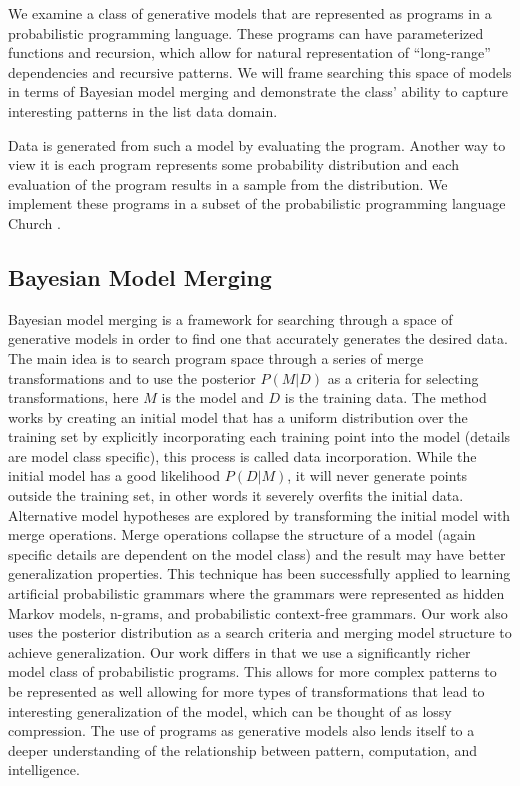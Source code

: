 \documentclass[a4paper,10pt]{article}
\begin{document}
We examine a class of generative models that are represented as programs in a probabilistic programming language.  These programs can have parameterized functions and recursion, which allow for natural representation of ``long-range'' dependencies and recursive patterns.  We will frame searching this space of models in terms of Bayesian model merging \cite{Stolcke:1994:IPG:645515.658235} and demonstrate the class' ability to capture interesting patterns in the list data domain.

Data is generated from such a model by evaluating the program.  Another way to view it is each program represents some probability distribution and each 
evaluation of the program results in a sample from the distribution. We implement these programs in a subset of the probabilistic programming language Church \cite{N.D.Goodman:2008:f2a0d}.  


\subsection{Bayesian Model Merging}
Bayesian model merging is a framework for searching through a space of generative models in order to find one that accurately generates the desired data.  The main idea is to search program space through a series of merge transformations and to use the posterior $P(M|D)$ as a criteria for selecting transformations, here $M$ is the model and $D$ is the training data.  The method works by creating an initial model that has a uniform distribution over the training set by explicitly incorporating each training point into the model (details are model class specific), this process is called data incorporation.  While the initial model has a good likelihood $P(D|M)$, it will never generate points outside the training set, in other words it severely overfits the initial data.  Alternative model hypotheses are explored by transforming the initial model with merge operations.  Merge operations collapse the structure of a model (again specific details are dependent on the model class) and the result may have better generalization properties.  This technique has been successfully applied to learning artificial probabilistic grammars where the grammars were represented as hidden Markov models, n-grams, and probabilistic context-free grammars.  Our work also uses the posterior distribution as a search criteria and merging model structure to achieve generalization.  Our work differs in that we use a significantly richer model class of probabilistic programs.  This allows for more complex patterns to be represented as well allowing for more types of transformations that lead to interesting generalization of the model, which can be thought of as lossy compression.   The use of programs as generative models also lends itself to a deeper understanding of the relationship between pattern, computation, and intelligence.
\end{document}
